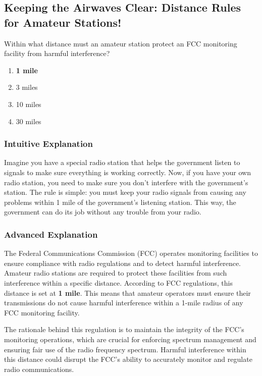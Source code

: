 \subsection{Keeping the Airwaves Clear: Distance Rules for Amateur Stations!}

\begin{tcolorbox}[colback=gray!10!white,colframe=black!75!black,title=E1B03] Within what distance must an amateur station protect an FCC monitoring facility from harmful interference?
    \begin{enumerate}[label=\Alph*),noitemsep]
        \item \textbf{1 mile}
        \item 3 miles
        \item 10 miles
        \item 30 miles
    \end{enumerate}
\end{tcolorbox}

\subsubsection{Intuitive Explanation}
Imagine you have a special radio station that helps the government listen to signals to make sure everything is working correctly. Now, if you have your own radio station, you need to make sure you don’t interfere with the government’s station. The rule is simple: you must keep your radio signals from causing any problems within 1 mile of the government’s listening station. This way, the government can do its job without any trouble from your radio.

\subsubsection{Advanced Explanation}
The Federal Communications Commission (FCC) operates monitoring facilities to ensure compliance with radio regulations and to detect harmful interference. Amateur radio stations are required to protect these facilities from such interference within a specific distance. According to FCC regulations, this distance is set at \textbf{1 mile}. This means that amateur operators must ensure their transmissions do not cause harmful interference within a 1-mile radius of any FCC monitoring facility.

The rationale behind this regulation is to maintain the integrity of the FCC's monitoring operations, which are crucial for enforcing spectrum management and ensuring fair use of the radio frequency spectrum. Harmful interference within this distance could disrupt the FCC's ability to accurately monitor and regulate radio communications.

